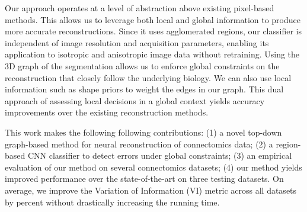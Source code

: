 Our approach operates at a level of abstraction above existing pixel-based methods. This allows us to leverage both local and global information to produce more accurate reconstructions. Since it uses agglomerated regions, our classifier is independent of image resolution and acquisition parameters, enabling its application to isotropic and anisotropic image data without retraining. Using the 3D graph of the segmentation allows us to enforce global constraints on the reconstruction that closely follow the underlying biology. We can also use local information such as shape priors to weight the edges in our graph. This dual approach of assessing local decisions in a global context yields accuracy improvements over the existing reconstruction methods.

This work makes the following following contributions: (1) a novel top-down graph-based method for neural reconstruction of connectomics data; (2) a region-based CNN classifier to detect errors under global constraints; (3) an empirical evaluation of our method on several connectomics datasets; (4) our method yields improved performance over the state-of-the-art on three testing datasets. On average, we improve the Variation of Information (VI) metric across all datasets by  percent without drastically increasing the running time.
